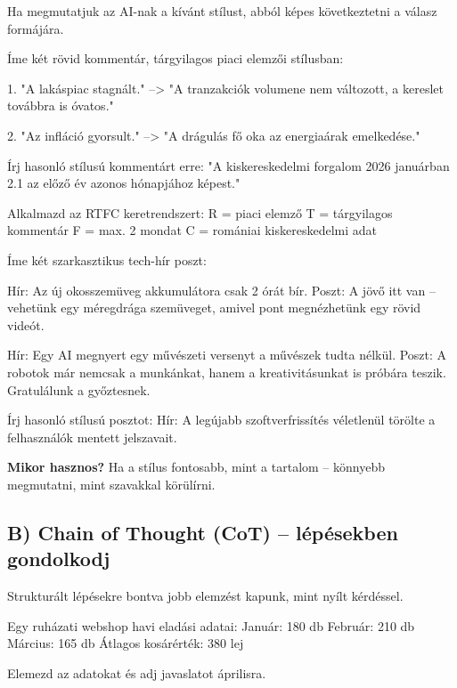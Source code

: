 \documentclass[11pt,a4paper]{article}
\newcommand{\tip}[1]{%
  \vspace{3pt}%
  \begin{tcolorbox}[tipstyle]%
  \textbf{\textcolor{tipborder}{Mikor hasznos?}} #1%
  \end{tcolorbox}\vspace{2pt}}
\newcommand{\lbl}[1]{\vspace{6pt}\noindent{\small\bfseries\textcolor{labelcolor}{#1}}\par\smallskip}
\begin{document}
Ha megmutatjuk az AI-nak a kívánt stílust, abból képes következtetni a válasz formájára.

\begin{prompt}
Íme két rövid kommentár, tárgyilagos piaci elemzői stílusban:

1. "A lakáspiac stagnált."
   --> "A tranzakciók volumene nem változott, a kereslet továbbra is óvatos."

2. "Az infláció gyorsult."
   --> "A drágulás fő oka az energiaárak emelkedése."

Írj hasonló stílusú kommentárt erre:
"A kiskereskedelmi forgalom 2026 januárban 2.1%
az előző év azonos hónapjához képest."

Alkalmazd az RTFC keretrendszert:
R = piaci elemző
T = tárgyilagos kommentár
F = max. 2 mondat
C = romániai kiskereskedelmi adat
\end{prompt}

\lbl{Alternatív feladat -- szarkasztikus tech poszt}

\begin{prompt}
Íme két szarkasztikus tech-hír poszt:

Hír: Az új okosszemüveg akkumulátora csak 2 órát bír.
Poszt: A jövő itt van -- vehetünk egy méregdrága szemüveget,
       amivel pont megnézhetünk egy rövid videót.

Hír: Egy AI megnyert egy művészeti versenyt a művészek tudta nélkül.
Poszt: A robotok már nemcsak a munkánkat, hanem a kreativitásunkat
       is próbára teszik. Gratulálunk a győztesnek.

Írj hasonló stílusú posztot:
Hír: A legújabb szoftverfrissítés véletlenül törölte a felhasználók
     mentett jelszavait.
\end{prompt}

\tip{Ha a stílus fontosabb, mint a tartalom -- könnyebb megmutatni, mint szavakkal körülírni.}

\subsection{B) Chain of Thought (CoT) -- lépésekben gondolkodj}

Strukturált lépésekre bontva jobb elemzést kapunk, mint nyílt kérdéssel.

\begin{prompt}
Egy ruházati webshop havi eladási adatai:
Január: 180 db   Február: 210 db   Március: 165 db
Átlagos kosárérték: 380 lej

Elemezd az adatokat és adj javaslatot áprilisra.
\end{prompt}
\end{document}
